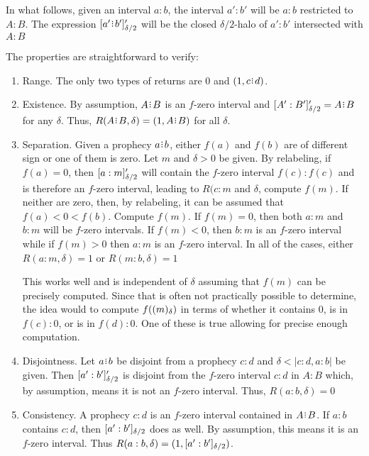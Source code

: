 \documentclass[12pt]{article}
\begin{document}
In what follows, given an interval $a:b$, the interval $a':b'$ will be $a:b$ restricted to $A:B$. The expression $\clhalo[\delta/2]{a' \rint b'}'$ will be the closed $\delta/2$-halo of $a':b'$ intersected with $A:B$

The properties are straightforward to verify:

\begin{enumerate}
\item Range. The only two types of returns are $0$ and $(1, c \rint d)$. 

\item Existence. By assumption, $A \rint B$ is an $f$-zero interval and $\clhalo[\delta/2]{A':B'}' = A \rint B$ for any $\delta$. Thus, $R(A \rint B, \delta) = (1, A \rint B)$ for all $\delta$. 

\item Separation. Given a prophecy $a \rint b$, either $f(a)$ and $f(b)$ are of different sign or one of them is zero. Let $m$ and $\delta > 0$ be given. By relabeling, if $f(a) =0$, then $\clhalo[\delta/2]{a:m}'$ will contain the $f$-zero interval $f(c):f(c)$ and is therefore an $f$-zero interval, leading to $R(c:m$ and $\delta$, compute $f(m)$. If neither are zero, then, by relabeling, it can be assumed that  $f(a) < 0 < f(b)$. Compute $f(m)$. If $f(m) = 0$, then both $a:m$ and $b:m$ will be $f$-zero intervals. If $f(m) < 0$, then $b:m$ is an $f$-zero interval while if $f(m) > 0$ then $a:m$ is an $f$-zero interval. In all of the cases, either $R(a:m, \delta) =1$ or $R(m:b, \delta) =1$

This works well and is independent of $\delta$ assuming that $f(m)$ can be precisely computed. Since that is often not practically possible to determine, the idea would to compute $f(\halo{m})$ in terms of whether it contains $0$, is in $f(c):0$, or is in $f(d):0$. One of these is true allowing for precise enough computation. 

\item Disjointness. Let $a \rint b$ be disjoint from a prophecy $c:d$ and $\delta < |c:d, a:b|$ be given. Then $\clhalo[\delta/2]{a':b'}'$ is disjoint from the $f$-zero interval $c:d$ in $A:B$ which, by assumption, means it is not an $f$-zero interval. Thus, $R(a:b, \delta) = 0$

\item Consistency. A prophecy $c:d$ is an $f$-zero interval contained in $A \rint B$. If $a:b$ contains $c:d$, then $\clhalo[\delta/2]{a':b'}$ does as well. By assumption, this means it is an $f$-zero interval. Thus $R(a:b, \delta) = (1, \clhalo[\delta/2]{a':b'})$.


\end{enumerate}
\end{document}

